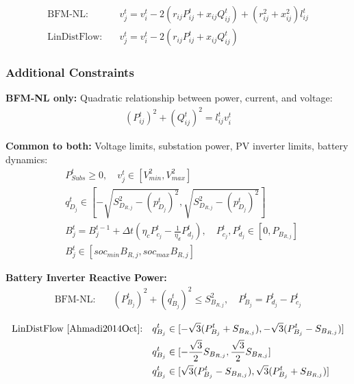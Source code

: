 \begin{align}
    \text{BFM-NL:} \quad &v_j^t = v_{i}^t - 2(r_{ij}P_{ij}^t + x_{ij}Q_{ij}^t) + (r_{ij}^2 + x_{ij}^2)l_{ij}^t
    \label{eq:mpopf-tradeoffs-kvl-nl} \\
    \text{LinDistFlow:} \quad &v_j^t = v_{i}^t - 2(r_{ij}P_{ij}^t + x_{ij}Q_{ij}^t)
    \label{eq:mpopf-tradeoffs-kvl-l}
\end{align}

\subsubsection{Additional Constraints}

\textbf{BFM-NL only:} Quadratic relationship between power, current, and voltage:
\begin{align}
    (P_{ij}^{t})^2 + (Q_{ij}^{t})^2 = l_{ij}^t v_i^t 
    \label{eq:mpopf-tradeoffs-apparent}
\end{align}

\textbf{Common to both:} Voltage limits, substation power, PV inverter limits, battery dynamics:
\begin{align}
    &P^t_{Subs} \geq 0, \quad v^{t}_{j} \in [V^{2}_{min}, V^{2}_{max}] \label{eq:mpopf-tradeoffs-common1} \\
    &q^{t}_{D_{j}} \in [-\sqrt{S_{D_{R,j}}^2 - (p^{t}_{D_{j}})^2}, \sqrt{S_{D_{R,j}}^2 - (p^{t}_{D_{j}})^2}] \label{eq:mpopf-tradeoffs-common2} \\
    &B_{j}^{t} = B_{j}^{t-1} + \Delta t (\eta_c P_{c_j}^t - \frac{1}{\eta_d} P_{d_j}^t), \quad P^{t}_{c_{j}}, P^{t}_{d_{j}} \in [0, P_{B_{R, j}}] \label{eq:mpopf-tradeoffs-common3} \\
    &B^{t}_{j} \in [soc_{min}B_{R, j}, soc_{max}B_{R, j}] \label{eq:mpopf-tradeoffs-common4}
\end{align}

\textbf{Battery Inverter Reactive Power:}
\begin{align}
    \text{BFM-NL:} \quad &(P_{B_j}^t)^2 + (q_{B_j}^t)^2 \leq S_{B_{R, j}}^2, \quad P_{B_j}^t = P_{d_j}^t - P_{c_j}^t
    \label{eq:mpopf-tradeoffs-battery-nl}
\end{align}

\begin{align}
    \text{LinDistFlow \cite{Ahmadi2014Oct}:} \quad &q_{B_j}^t \in [-\sqrt{3}(P_{B_j}^t + S_{B_{R,j}}), -\sqrt{3}(P_{B_j}^t - S_{B_{R,j}})] \nonumber \\
    &q_{B_j}^t \in [-\frac{\sqrt{3}}{2}S_{B_{R,j}}, \frac{\sqrt{3}}{2}S_{B_{R,j}}] \label{eq:mpopf-tradeoffs-battery-l} \\
    &q_{B_j}^t \in [\sqrt{3}(P_{B_j}^t - S_{B_{R,j}}), \sqrt{3}(P_{B_j}^t + S_{B_{R,j}})] \nonumber
\end{align}

